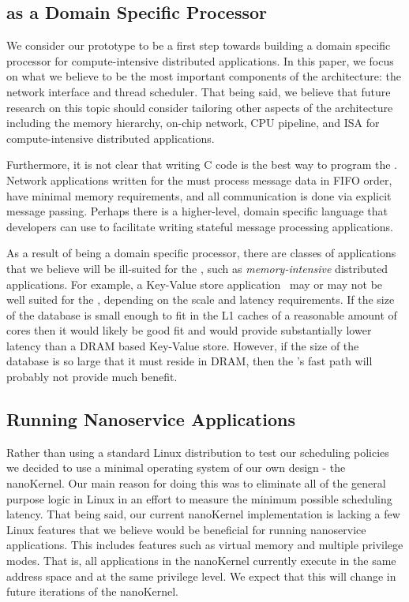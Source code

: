 \subsection{\name{} as a Domain Specific Processor}
We consider our \name{} prototype to be a first step towards building a domain specific processor for compute-intensive distributed applications.
In this paper, we focus on what we believe to be the most important components of the architecture: the network interface and thread scheduler.
That being said, we believe that future research on this topic should consider tailoring other aspects of the architecture including the memory hierarchy, on-chip network, CPU pipeline, and ISA for compute-intensive distributed applications.

Furthermore, it is not clear that writing C code is the best way to program the \name{}. Network applications written for the \name{} must process message data in FIFO order, have minimal memory requirements, and all communication is done via explicit message passing.
Perhaps there is a higher-level, domain specific language that developers can use to facilitate writing stateful message processing applications.

As a result of being a domain specific processor, there are classes of applications that we believe will be ill-suited for the \name{}, such as \emph{memory-intensive} distributed applications.
For example, a Key-Value store application~\cite{memcached} may or may not be well suited for the \name{}, depending on the scale and latency requirements.
If the size of the database is small enough to fit in the L1 caches of a reasonable amount of \name{} cores then it would likely be good fit and would provide substantially lower latency than a DRAM based Key-Value store.
However, if the size of the database is so large that it must reside in DRAM, then the \name{}'s fast path will probably not provide much benefit.

\subsection{Running Nanoservice Applications}
Rather than using a standard Linux distribution to test our scheduling policies we decided to use a minimal operating system of our own design - the nanoKernel.
Our main reason for doing this was to eliminate all of the general purpose logic in Linux in an effort to measure the minimum possible scheduling latency.
That being said, our current nanoKernel implementation is lacking a few Linux features that we believe would be beneficial for running nanoservice applications.
This includes features such as virtual memory and multiple privilege modes.
That is, all applications in the nanoKernel currently execute in the same address space and at the same privilege level.
We expect that this will change in future iterations of the nanoKernel.


